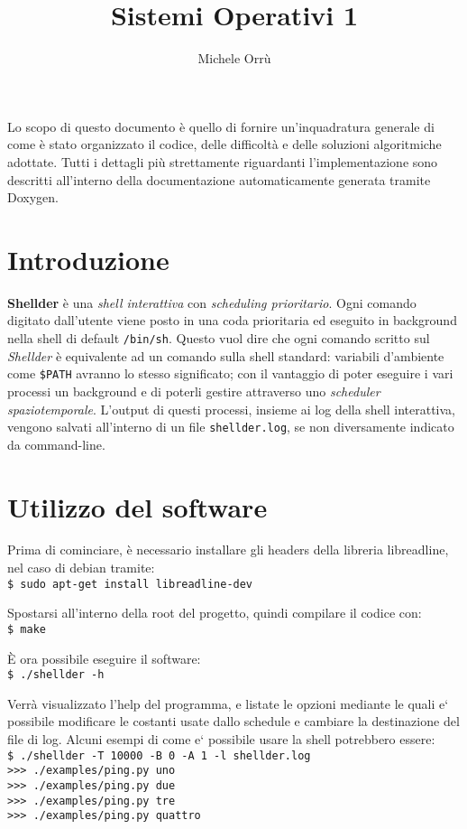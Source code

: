 \documentclass[11pt]{article}
\title{\textbf{Sistemi Operativi 1}}
\author{Michele Orr\`u}
\date{}
\begin{document}
\maketitle

\abstract 
Lo scopo di questo documento \`e quello di fornire un'inquadratura generale di come \`e stato organizzato il 
codice, delle difficolt\`a e delle soluzioni algoritmiche adottate. Tutti i dettagli pi\`u strettamente 
riguardanti l'implementazione sono descritti all'interno della documentazione automaticamente generata 
tramite Doxygen.

\section{Introduzione}

\textbf{Shellder} \`e una \emph{shell interattiva} con \emph{scheduling prioritario}.
Ogni comando digitato dall'utente viene posto in una coda prioritaria ed eseguito in background nella shell di
default \texttt{/bin/sh}. Questo vuol dire che ogni comando scritto sul \emph{Shellder} \`e equivalente ad un
comando sulla shell standard: variabili d'ambiente come \texttt{\$PATH} avranno lo stesso significato;
con il vantaggio di poter eseguire i vari processi un background e di poterli gestire attraverso uno 
\emph{scheduler spaziotemporale}.
L'output di questi processi, insieme ai log della shell interattiva, vengono salvati all'interno di un file 
\texttt{shellder.log}, se non diversamente indicato da command-line.

\section{Utilizzo del software} 

Prima di cominciare, \`e necessario installare gli headers della libreria libreadline, nel caso di debian tramite:
\\ \texttt{\$ sudo apt-get install libreadline-dev}

\noindent Spostarsi all'interno della root del progetto, quindi compilare il codice con:
\\ \texttt{\$ make}

\noindent \`E ora possibile eseguire il software: 
\\ \texttt{\$ ./shellder -h}

\noindent Verr\`a visualizzato l'help del programma, e listate le opzioni mediante le quali e` possibile modificare le costanti usate dallo schedule e cambiare la destinazione del file di log.
Alcuni esempi di come e` possibile usare la shell potrebbero essere:
\\ \texttt{\$ ./shellder -T 10000 -B 0 -A 1 -l shellder.log}
\\ \texttt{>>> ./examples/ping.py uno}
\\ \texttt{>>> ./examples/ping.py due}
\\ \texttt{>>> ./examples/ping.py tre}
\\ \texttt{>>> ./examples/ping.py quattro}
 
\end{document}

